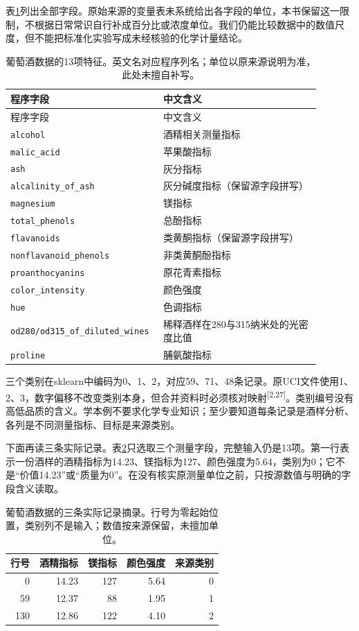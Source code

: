 表\ref{tab:wine-fields}列出全部字段。原始来源的变量表未系统给出各字段的单位，本书保留这一限制，不根据日常常识自行补成百分比或浓度单位。我们仍能比较数据中的数值尺度，但不能把标准化实验写成未经核验的化学计量结论。
\begin{longtable}{p{0.40\linewidth}p{0.49\linewidth}}
\caption{葡萄酒数据的13项特征。英文名对应程序列名；单位以原来源说明为准，此处未擅自补写。}\label{tab:wine-fields}\\
\toprule 程序字段&中文含义\\\midrule\endfirsthead
\toprule 程序字段&中文含义\\\midrule\endhead
\texttt{alcohol}&酒精相关测量指标\\
\texttt{malic\_acid}&苹果酸指标\\
\texttt{ash}&灰分指标\\
\texttt{alcalinity\_of\_ash}&灰分碱度指标（保留源字段拼写）\\
\texttt{magnesium}&镁指标\\
\texttt{total\_phenols}&总酚指标\\
\texttt{flavanoids}&类黄酮指标（保留源字段拼写）\\
\texttt{nonflavanoid\_phenols}&非类黄酮酚指标\\
\texttt{proanthocyanins}&原花青素指标\\
\texttt{color\_intensity}&颜色强度\\
\texttt{hue}&色调指标\\
\texttt{od280/od315\_of\_diluted\_wines}&稀释酒样在280与315纳米处的光密度比值\\
\texttt{proline}&脯氨酸指标\\\bottomrule
\end{longtable}

三个类别在sklearn中编码为0、1、2，对应59、71、48条记录。原UCI文件使用1、2、3，数字偏移不改变类别本身，但合并资料时必须核对映射\textsuperscript{[2,27]}。类别编号没有高低品质的含义。学本例不要求化学专业知识；至少要知道每条记录是酒样分析、各列是不同测量指标、目标是来源类别。

下面再读三条实际记录。表\ref{tab:wine-records}只选取三个测量字段，完整输入仍是13项。第一行表示一份酒样的酒精指标为14.23、镁指标为127、颜色强度为5.64，类别为0；它不是“价值14.23”或“质量为0”。在没有核实原测量单位之前，只按源数值与明确的字段含义读取。
\begin{table}[htbp]\centering\small
\caption{葡萄酒数据的三条实际记录摘录。行号为零起始位置，类别列不是输入；数值按来源保留，未擅加单位。}\label{tab:wine-records}
\begin{tabular}{rrrrr}\toprule
行号&酒精指标&镁指标&颜色强度&来源类别\\\midrule
0&14.23&127&5.64&0\\
59&12.37&88&1.95&1\\
130&12.86&122&4.10&2\\\bottomrule
\end{tabular}\end{table}

